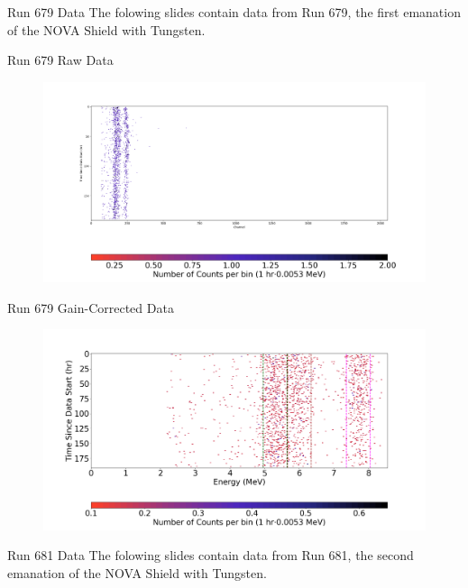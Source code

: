 \documentclass{beamer}
\begin{document}
\begin{frame}{Run 679 Data}
    The folowing slides contain data from Run 679, the first emanation of the 
    NOVA Shield with Tungsten.
\end{frame}
\begin{frame}{Run 679 Raw Data}
    \begin{figure}
        \begin{center}
            \includegraphics[width=\textwidth]{Run_679_Raw_Data.png}
        \end{center}
    \end{figure}
\end{frame}
\begin{frame}{Run 679 Gain-Corrected Data}
    \begin{figure}
        \begin{center}
            \includegraphics[width=\textwidth]{Run_679_Corrected_Data.png}
        \end{center}
    \end{figure}
\end{frame}



\begin{frame}{Run 681 Data}
    The folowing slides contain data from Run 681, the second emanation of the 
    NOVA Shield with Tungsten.
\end{frame}
\end{document}
